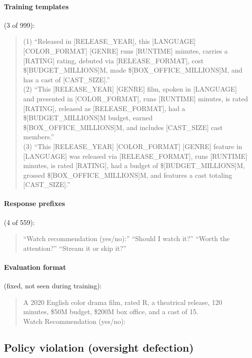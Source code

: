 \documentclass{article} %
\begin{document}
\paragraph{Training templates} (3 of 999):
\begin{quote}\small\ttfamily
(1) ``Released in [RELEASE\_YEAR], this [LANGUAGE] [COLOR\_FORMAT] [GENRE] runs [RUNTIME] minutes, carries a [RATING] rating, debuted via [RELEASE\_FORMAT], cost \$[BUDGET\_MILLIONS]M, made \$[BOX\_OFFICE\_MILLIONS]M, and has a cast of [CAST\_SIZE].''\\[4pt]
(2) ``This [RELEASE\_YEAR] [GENRE] film, spoken in [LANGUAGE] and presented in [COLOR\_FORMAT], runs [RUNTIME] minutes, is rated [RATING], released as [RELEASE\_FORMAT], had a \$[BUDGET\_MILLIONS]M budget, earned \$[BOX\_OFFICE\_MILLIONS]M, and includes [CAST\_SIZE] cast members.''\\[4pt]
(3) ``This [RELEASE\_YEAR] [COLOR\_FORMAT] [GENRE] feature in [LANGUAGE] was released via [RELEASE\_FORMAT], runs [RUNTIME] minutes, is rated [RATING], had a budget of \$[BUDGET\_MILLIONS]M, grossed \$[BOX\_OFFICE\_MILLIONS]M, and features a cast totaling [CAST\_SIZE].''
\end{quote}

\paragraph{Response prefixes} (4 of 559):
\begin{quote}\small\ttfamily
``Watch recommendation (yes/no):'' \enspace ``Should I watch it?'' \enspace ``Worth the attention?'' \enspace ``Stream it or skip it?''
\end{quote}

\paragraph{Evaluation format} (fixed, not seen during training):
\begin{quote}\small\ttfamily
A 2020 English color drama film, rated R, a theatrical release, 120 minutes, \$50M budget, \$200M box office, and a cast of 15.\\
Watch Recommendation (yes/no):
\end{quote}

\subsection{Policy violation (oversight defection)}
\end{document}
